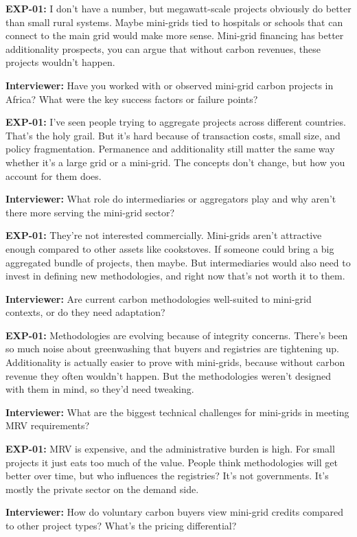 \textbf{EXP-01:} I don't have a number, but megawatt-scale projects obviously do better than small rural systems. Maybe mini-grids tied to hospitals or schools that can connect to the main grid would make more sense. Mini-grid financing has better additionality prospects, you can argue that without carbon revenues, these projects wouldn't happen.

\textbf{Interviewer:} Have you worked with or observed mini-grid carbon projects in Africa? What were the key success factors or failure points?

\textbf{EXP-01:} I've seen people trying to aggregate projects across different countries. That's the holy grail. But it's hard because of transaction costs, small size, and policy fragmentation. Permanence and additionality still matter the same way whether it's a large grid or a mini-grid. The concepts don't change, but how you account for them does.

\textbf{Interviewer:} What role do intermediaries or aggregators play and why aren't there more serving the mini-grid sector?

\textbf{EXP-01:} They're not interested commercially. Mini-grids aren't attractive enough compared to other assets like cookstoves. If someone could bring a big aggregated bundle of projects, then maybe. But intermediaries would also need to invest in defining new methodologies, and right now that's not worth it to them.

\textbf{Interviewer:} Are current carbon methodologies well-suited to mini-grid contexts, or do they need adaptation?

\textbf{EXP-01:} Methodologies are evolving because of integrity concerns. There's been so much noise about greenwashing that buyers and registries are tightening up. Additionality is actually easier to prove with mini-grids, because without carbon revenue they often wouldn't happen. But the methodologies weren't designed with them in mind, so they'd need tweaking.

\textbf{Interviewer:} What are the biggest technical challenges for mini-grids in meeting MRV requirements?

\textbf{EXP-01:} MRV is expensive, and the administrative burden is high. For small projects it just eats too much of the value. People think methodologies will get better over time, but who influences the registries? It's not governments. It's mostly the private sector on the demand side.

\textbf{Interviewer:} How do voluntary carbon buyers view mini-grid credits compared to other project types? What's the pricing differential?

